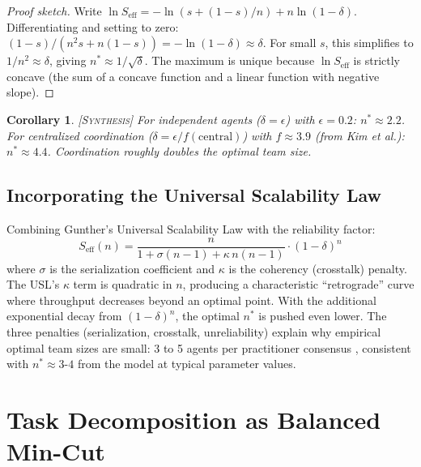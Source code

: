 \documentclass[11pt]{article}
\newtheorem{corollary}[theorem]{Corollary}
\theoremstyle{definition}
\theoremstyle{remark}
\newcommand{\synthesis}{\textsc{[Synthesis]}}
\begin{document}
\begin{proof}[Proof sketch]
Write $\ln S_{\mathrm{eff}} = -\ln(s + (1-s)/n) + n \ln(1-\delta)$.
Differentiating and setting to zero: $(1-s)/(n^2 s + n(1-s)) = -\ln(1-\delta) \approx \delta$.
For small $s$, this simplifies to $1/n^2 \approx \delta$, giving $n^* \approx 1/\sqrt{\delta}$.
The maximum is unique because $\ln S_{\mathrm{eff}}$ is strictly concave (the sum of a concave function and a linear function with negative slope).
\end{proof}

\begin{corollary} \synthesis{}
For independent agents ($\delta = \epsilon$) with $\epsilon = 0.2$: $n^* \approx 2.2$.
For centralized coordination ($\delta = \epsilon / f(\mathrm{central})$) with $f \approx 3.9$ (from Kim et al.): $n^* \approx 4.4$.
Coordination roughly doubles the optimal team size.
\end{corollary}

\subsection{Incorporating the Universal Scalability Law}

Combining Gunther's Universal Scalability Law \citep{Gunther2008} with the reliability factor:
\begin{equation}
\label{eq:usl-extended}
  S_{\mathrm{eff}}(n) = \frac{n}{1 + \sigma(n-1) + \kappa \, n(n-1)} \cdot (1-\delta)^n
\end{equation}
where $\sigma$ is the serialization coefficient and $\kappa$ is the coherency (crosstalk) penalty.
The USL's $\kappa$ term is quadratic in $n$, producing a characteristic ``retrograde'' curve where throughput decreases beyond an optimal point.
With the additional exponential decay from $(1-\delta)^n$, the optimal $n^*$ is pushed even lower.
The three penalties (serialization, crosstalk, unreliability) explain why empirical optimal team sizes are small: 3 to 5 agents per practitioner consensus \citep{Osmani2025}, consistent with $n^* \approx 3$-$4$ from the model at typical parameter values.


\section{Task Decomposition as Balanced Min-Cut}
\label{sec:decomp}
\end{document}
